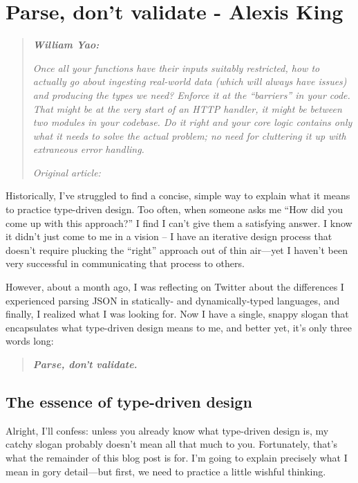 

\chapter{Parse, don't validate - Alexis King}

\begin{quotation}
\noindent\textit{\textbf{William Yao:}}

\textit{Once all your functions have their inputs suitably restricted, how to actually go about ingesting real-world data (which will always have issues) and producing the types we need? Enforce it at the ``barriers'' in your code. That might be at the very start of an HTTP handler, it might be between two modules in your codebase. Do it right and your core logic
contains only what it needs to solve the actual problem; no need for cluttering it up with extraneous error handling.}

\vspace{\baselineskip}

\noindent\textit{Original article: \cite{parse_dont_validate}}
\end{quotation}

Historically, I've struggled to find a concise, simple way to explain what it means to practice type-driven design. Too often, when someone asks me ``How did you come up with this approach?'' I find I can't give them a satisfying answer. I know it didn't just come to me in a vision -- I have an iterative design process that doesn't require plucking the ``right'' approach out of thin air—yet I haven't been very successful in communicating that process to others.

However, about a month ago, I was reflecting on Twitter about the differences I experienced parsing JSON in statically- and dynamically-typed languages, and finally, I realized what I was looking for. Now I have a single, snappy slogan that encapsulates what type-driven design means to me, and better yet, it's only three words long:

\begin{quotation}
\textbf{\textit{Parse, don't validate.}}
\end{quotation}

\section{The essence of type-driven design}

Alright, I'll confess: unless you already know what type-driven design is, my catchy slogan probably doesn't mean all that much to you. Fortunately, that's what the remainder of this blog post is for. I'm going to explain precisely what I mean in gory detail—but first, we need to practice a little wishful thinking.

